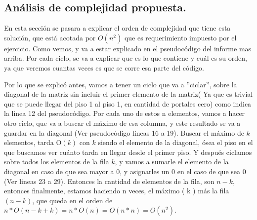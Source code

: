 

\subsection{Análisis de complejidad propuesta.}
En esta sección se pasara a explicar el orden de complejidad que tiene esta solución, que está acotada por $O(n^2)$ que es requerimiento impuesto por el ejercicio. Como vemos, y va a estar explicado en el pseudocódigo del informe mas arriba.  Por cada ciclo, se va a explicar que es lo que contiene y cuál es su orden, ya que veremos cuantas veces es que se corre esa parte del código. \newline

Por lo que se explicó antes, vamos a tener un ciclo que va a ''ciclar'', sobre la diagonal de la matriz sin incluir el primer elemento de la matriz( Ya que es trivial que se puede llegar del piso 1 al piso 1, en cantidad de portales cero) como indica la linea 12 del pseudocódigo. Por cada uno de estos n elementos, vamos a hacer otro ciclo, que va a buscar el máximo de esa columna, y este resultado se va a guardar en la diagonal (Ver pseudocódigo lineas 16 a 19). Buscar el máximo de $k$ elementos, tarda O$(k)$ con $k$ siendo el elemento de la diagonal, ósea el piso en el que buscamos ver cuánto tarda en llegar desde el primer piso. Y después ciclamos sobre todos los elementos de la fila $k$, y vamos a sumarle el elemento de la diagonal en caso de que sea mayor a $0$, y asignarles un $0$ en el caso de que sea $0$ (Ver lineas 23 a 29). Entonces la cantidad de elementos de la fila, son $n-k$, entonces finalmente, estamos haciendo n veces, el máximo ( k ) más la fila $(n-k)$, que queda en el orden de $n*O(n-k+k) = n*O(n) = O(n*n) = O(n^2)$. \newline 

